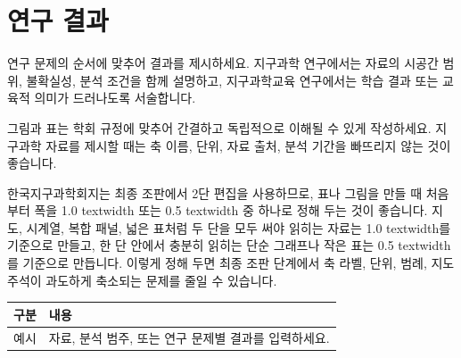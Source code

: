 \section{연구 결과}

연구 문제의 순서에 맞추어 결과를 제시하세요. 지구과학 연구에서는 자료의 시공간 범위, 불확실성, 분석 조건을 함께 설명하고, 지구과학교육 연구에서는 학습 결과 또는 교육적 의미가 드러나도록 서술합니다.

그림과 표는 학회 규정에 맞추어 간결하고 독립적으로 이해될 수 있게 작성하세요. 지구과학 자료를 제시할 때는 축 이름, 단위, 자료 출처, 분석 기간을 빠뜨리지 않는 것이 좋습니다.

한국지구과학회지는 최종 조판에서 2단 편집을 사용하므로, 표나 그림을 만들 때 처음부터 폭을 1.0 textwidth 또는 0.5 textwidth 중 하나로 정해 두는 것이 좋습니다. 지도, 시계열, 복합 패널, 넓은 표처럼 두 단을 모두 써야 읽히는 자료는 1.0 textwidth를 기준으로 만들고, 한 단 안에서 충분히 읽히는 단순 그래프나 작은 표는 0.5 textwidth를 기준으로 만듭니다. 이렇게 정해 두면 최종 조판 단계에서 축 라벨, 단위, 범례, 지도 주석이 과도하게 축소되는 문제를 줄일 수 있습니다.

\begin{ManuscriptWideTable}
\caption{한국지구과학회지 원고용 표 예시}
\label{tab:example}
\centering
\begin{tabular}{ll}
\toprule
구분 & 내용 \\
\midrule
예시 & 자료, 분석 범주, 또는 연구 문제별 결과를 입력하세요. \\
\bottomrule
\end{tabular}
\end{ManuscriptWideTable}
